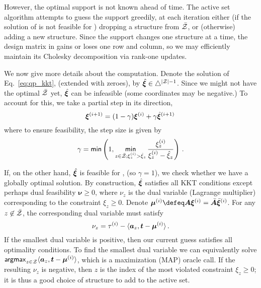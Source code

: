 However, the optimal support is not known ahead of time. The active set
algorithm attempts to guess the support greedily,
at each iteration either (if the solution of  is not feasible
for )
dropping a structure from $\bar{\mathcal{Z}}$, or (otherwise) adding a new structure.
Since the support changes one structure at a time, the design matrix in
 gains or loses one row and column, so
we may efficiently maintain its Cholesky decomposition via rank-one updates.

We now give more details about the computation.
Denote the solution of Eq.~\ref{eq:qp_kkt}, (extended with zeroes),
by $\hat{\bm{\xi}} \in \triangle^{|\mathcal{Z}|-1}$.
Since we might not have the optimal $\bar{\mathcal{Z}}$ yet, $\hat{\bm{\xi}}$ can be infeasible
(some coordinates may be negative.)
To account for this, we take a partial step in its direction,
%
\begin{equation}
    \bm{\xi}^{(i+1)} = (1-\gamma)\bm{\xi}^{(i)} + \gamma \hat{\bm{\xi}}^{(i+1)}\,
\end{equation}
%
where to ensure feasibility, the step size is given by
%
\begin{equation}\label{eq:step_size}
    \gamma = \operatorname*{\mathsf{min}} \left(1, \operatorname*{\mathsf{min}}_{z \in \bar{\mathcal{Z}}; \xi^{(i)}_z > \hat{\xi}_z}
    \frac{
        \xi^{(i)}_z
    }{
        \xi^{(i)}_z - \hat{\xi}_z}
    \right)\,.
\end{equation}

If, on the other hand, $\hat{\bm{\xi}}$ is feasible for ,
(so $\gamma=1$),
we check whether we have a globally optimal solution.
By construction, $\hat{\bm{\xi}}$ satisfies all KKT
conditions except perhaps dual feasibility $\bm{\nu} \geq 0$,
where $\nu_z$ is the dual variable (Lagrange multiplier) corresponding to the
constraint $\xi_z \geq 0$.
Denote $\bm{\mu}^{(i)} \defeq \bm{A}\pv^{(i)} = \bar{\bm{A}}\bar{\pv}^{(i)}$.
For any $z \not\in \bar{\mathcal{Z}}$, the corresponding dual variable must satisfy
%
\begin{equation}\label{eq:dual}
    \nu_z = \tau^{(i)} - \langle\bm{a}_z,\bm{t} - \bm{\mu}^{(i)}\rangle\,.
\end{equation}
%
If the smallest dual variable is positive, then our current guess satisfies all
optimality conditions. To find the smallest dual variable we can equivalently
solve $\operatorname*{\mathsf{argmax}}_{z \in \mathcal{Z}} \langle\bm{a}_z,\bm{t} - \bm{\mu}^{(i)}\rangle$, which is
a maximization (MAP) oracle call. If the resulting $\nu_z$ is negative,
then $z$ is the index of the most violated constraint $\xi_z \geq 0$;
it is thus a good choice of structure to add to the active set.

